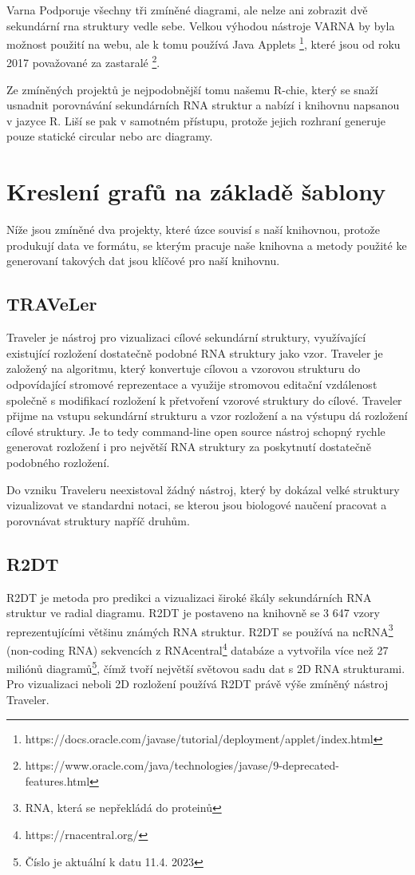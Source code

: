 Varna Podporuje všechny tři zmíněné diagrami, ale nelze ani zobrazit dvě
sekundární rna struktury vedle sebe. Velkou výhodou nástroje VARNA by byla
možnost použití na webu, ale k tomu používá Java Applets
\footnote{https://docs.oracle.com/javase/tutorial/deployment/applet/index.html},
které jsou od roku 2017 považované za zastaralé
\footnote{https://www.oracle.com/java/technologies/javase/9-deprecated-features.html}.

Ze zmíněných projektů je nejpodobnější tomu našemu R-chie, který se snaží
usnadnit porovnávání sekundárních RNA struktur a nabízí i knihovnu napsanou v
jazyce R. Liší se pak v samotném přístupu, protože jejich rozhraní generuje
pouze statické circular nebo arc diagramy.

\section{Kreslení grafů na základě šablony}

Níže jsou zmíněné dva projekty, které úzce souvisí s naší knihovnou, protože
produkují data ve formátu, se kterým pracuje naše knihovna a metody
použité ke generovaní takových dat jsou klíčové pro naší knihovnu.

\subsection{TRAVeLer} 

Traveler\cite{Traveler2017} je nástroj pro vizualizaci cílové sekundární
struktury, využívající existující rozložení dostatečně podobné RNA struktury
jako vzor. Traveler je založený na algoritmu, který konvertuje cílovou a
vzorovou strukturu do odpovídající stromové reprezentace a využije stromovou
editační vzdálenost společně s modifikací rozložení k přetvoření vzorové
struktury do cílové. Traveler přijme na vstupu sekundární strukturu a vzor
rozložení a na výstupu dá rozložení cílové struktury. Je to tedy command-line
open source nástroj schopný rychle generovat rozložení i pro největší RNA
struktury za poskytnutí dostatečně podobného rozložení.

Do vzniku Traveleru neexistoval žádný nástroj, který by dokázal velké struktury
vizualizovat ve standardni notaci, se kterou jsou biologové naučení pracovat a
porovnávat struktury napříč druhům.

\subsection{R2DT} 

R2DT\cite{R2DT2021} je metoda pro predikci a vizualizaci široké škály
sekundárních RNA struktur ve radial diagramu. R2DT je postaveno na knihovně se
3 647 vzory reprezentujícími většinu známých RNA struktur. R2DT se používá na
ncRNA\footnote{RNA, která se nepřekládá do proteinů} (non-coding RNA)
sekvencích z RNAcentral\footnote{https://rnacentral.org/} databáze a vytvořila
více než 27 miliónů diagramů\footnote{Číslo je aktuální k datu 11.4. 2023},
čímž tvoří největší světovou sadu dat s 2D RNA strukturami. Pro vizualizaci
neboli 2D rozložení používá R2DT právě výše zmíněný nástroj Traveler.
